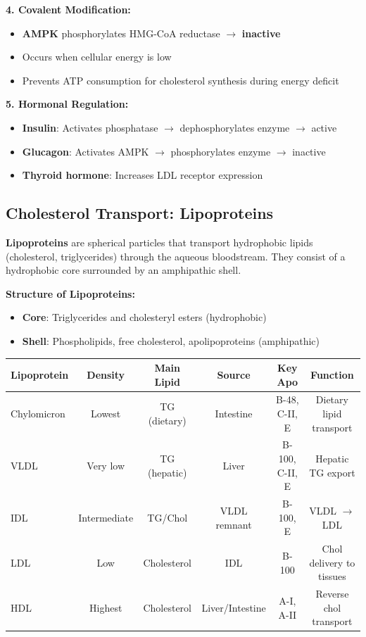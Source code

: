 \textbf{4. Covalent Modification:}
\begin{itemize}
    \item \textbf{AMPK} phosphorylates HMG-CoA reductase $\rightarrow$ \textbf{inactive}
    \item Occurs when cellular energy is low
    \item Prevents ATP consumption for cholesterol synthesis during energy deficit
\end{itemize}

\textbf{5. Hormonal Regulation:}
\begin{itemize}
    \item \textbf{Insulin}: Activates phosphatase $\rightarrow$ dephosphorylates enzyme $\rightarrow$ active
    \item \textbf{Glucagon}: Activates AMPK $\rightarrow$ phosphorylates enzyme $\rightarrow$ inactive
    \item \textbf{Thyroid hormone}: Increases LDL receptor expression
\end{itemize}

\subsection{Cholesterol Transport: Lipoproteins}

\begin{definition}
\textbf{Lipoproteins} are spherical particles that transport hydrophobic lipids (cholesterol, triglycerides) through the aqueous bloodstream. They consist of a hydrophobic core surrounded by an amphipathic shell.
\end{definition}

\textbf{Structure of Lipoproteins:}
\begin{itemize}
    \item \textbf{Core}: Triglycerides and cholesteryl esters (hydrophobic)
    \item \textbf{Shell}: Phospholipids, free cholesterol, apolipoproteins (amphipathic)
\end{itemize}

\begin{center}
\begin{tabular}{lccccc}
\toprule
\textbf{Lipoprotein} & \textbf{Density} & \textbf{Main Lipid} & \textbf{Source} & \textbf{Key Apo} & \textbf{Function} \\
\midrule
Chylomicron & Lowest & TG (dietary) & Intestine & B-48, C-II, E & Dietary lipid transport \\
VLDL & Very low & TG (hepatic) & Liver & B-100, C-II, E & Hepatic TG export \\
IDL & Intermediate & TG/Chol & VLDL remnant & B-100, E & VLDL $\rightarrow$ LDL \\
LDL & Low & Cholesterol & IDL & B-100 & Chol delivery to tissues \\
HDL & Highest & Cholesterol & Liver/Intestine & A-I, A-II & Reverse chol transport \\
\bottomrule
\end{tabular}
\end{center}

